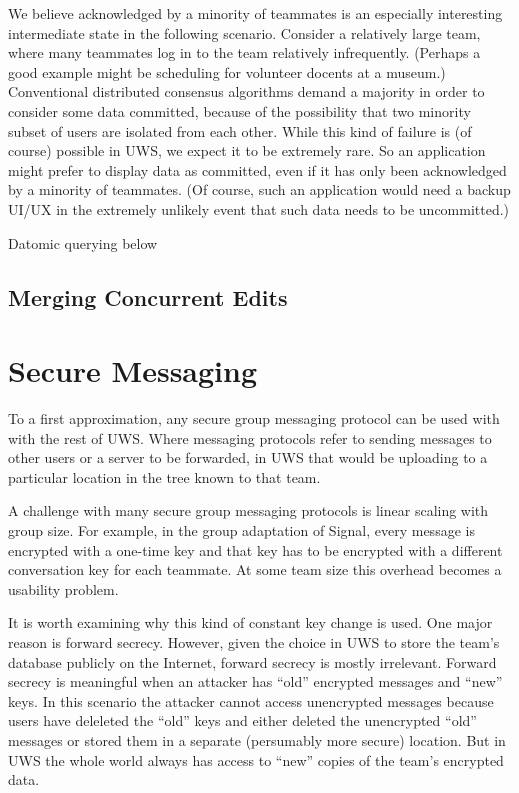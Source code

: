 \documentclass{article}
\begin{document}
We believe acknowledged by a minority of teammates is an especially interesting intermediate state in the following scenario.
Consider a relatively large team, where many teammates log in to the team relatively infrequently.
(Perhaps a good example might be scheduling for volunteer docents at a museum.)
Conventional distributed consensus algorithms demand a majority in order to consider some data committed, because of the possibility that two minority subset of users are isolated from each other.
While this kind of failure is (of course) possible in UWS, we expect it to be extremely rare.
So an application might prefer to display data as committed, even if it has only been acknowledged by a minority of teammates.
(Of course, such an application would need a backup UI/UX in the extremely unlikely event that such data needs to be uncommitted.)

Datomic querying below

\subsection{Merging Concurrent Edits}




\section{Secure Messaging}

To a first approximation, any secure group messaging protocol can be used with with the rest of UWS.
Where messaging protocols refer to sending messages to other users or a server to be forwarded, in UWS that would be uploading to a particular location in the tree known to that team.

A challenge with many secure group messaging protocols is linear scaling with group size.
For example, in the group adaptation of Signal, every message is encrypted with a one-time key and that key has to be encrypted with a different conversation key for each teammate.
At some team size this overhead becomes a usability problem.

It is worth examining why this kind of constant key change is used.
One major reason is forward secrecy.
However, given the choice in UWS to store the team's database publicly on the Internet, forward secrecy is mostly irrelevant.
Forward secrecy is meaningful when an attacker has ``old'' encrypted messages and ``new'' keys.
In this scenario the attacker cannot access unencrypted messages because users have deleleted the ``old'' keys and either deleted the unencrypted ``old'' messages or stored them in a separate (persumably more secure) location.
But in UWS the whole world always has access to ``new'' copies of the team's encrypted data.
\end{document}
